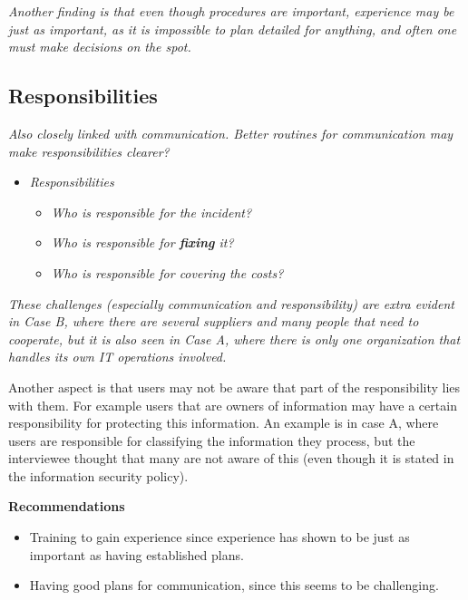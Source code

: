 \textit{Another finding is that even though procedures are important, experience may be just as important, as it is impossible to plan detailed for anything, and often one must make decisions on the spot.}

\subsection{Responsibilities}
\textit{Also closely linked with communication. Better routines for communication may make responsibilities clearer?}

\begin{itemize}
\item \textit{Responsibilities}
\begin{itemize}
\item \textit{Who is responsible for the incident?}
\item \textit{Who is responsible for \textbf{fixing} it?}
\item \textit{Who is responsible for covering the costs?}
\end{itemize}
\end{itemize}

\textit{These challenges (especially communication and responsibility) are extra evident in Case B, where there are several suppliers and many people that need to cooperate, but it is also seen in Case A, where there is only one organization that handles its own IT operations involved.}

Another aspect is that users may not be aware that part of the responsibility lies with them. For example users that are owners of information may have a certain responsibility for protecting this information. An example is in case A, where users are responsible for classifying the information they process, but the interviewee thought that many are not aware of this (even though it is stated in the information security policy).

\textbf{Recommendations}
\begin{itemize}
\item Training to gain experience since experience has shown to be just as important as having established plans.
\item Having good plans for communication, since this seems to be challenging.
\end{itemize}

